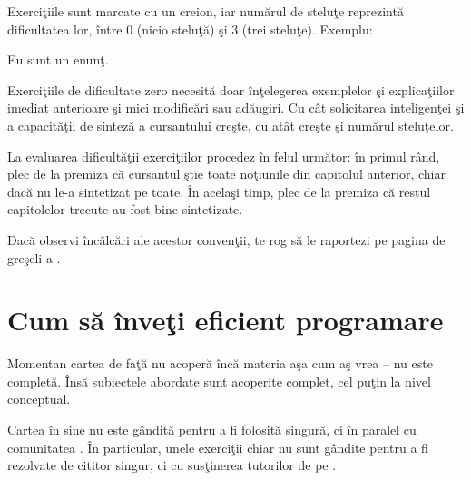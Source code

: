 
Exerciţiile sunt marcate cu un creion, iar numărul de steluţe reprezintă dificultatea lor, între 0 (nicio steluţă)
şi 3 (trei steluţe). Exemplu:
\begin{Exercise*}[title={Exerciţiu de dificultate 1},difficulty=1]
	Eu sunt un enunţ.
\end{Exercise*}

Exerciţiile de dificultate zero necesită doar înţelegerea exemplelor şi
explicaţiilor imediat anterioare şi mici modificări sau adăugiri.
Cu cât solicitarea inteligenţei şi a capacităţii de sinteză a cursantului
creşte, cu atât creşte şi numărul steluţelor.

La evaluarea dificultăţii exerciţiilor procedez în
felul următor: în primul rând, plec de la premiza că
cursantul ştie toate noţiunile din capitolul anterior,
chiar dacă nu le-a sintetizat pe toate. În acelaşi timp,
plec de la premiza că restul capitolelor trecute
au fost bine sintetizate.



Dacă observi încălcări ale acestor convenţii, te rog să le
raportezi pe pagina de greşeli a \phpro.
{}
\section*{Cum să înveţi eficient programare}

Momentan cartea de faţă nu acoperă încă materia aşa cum aş vrea -- nu este completă.
Însă subiectele abordate sunt acoperite complet, cel puţin la nivel conceptual.

Cartea în sine nu este gândită pentru a fi folosită singură, ci
în paralel cu comunitatea \phpro. În particular, unele exerciţii
chiar nu sunt gândite pentru a fi rezolvate de cititor singur,
ci cu susţinerea tutorilor de pe \phpro.

